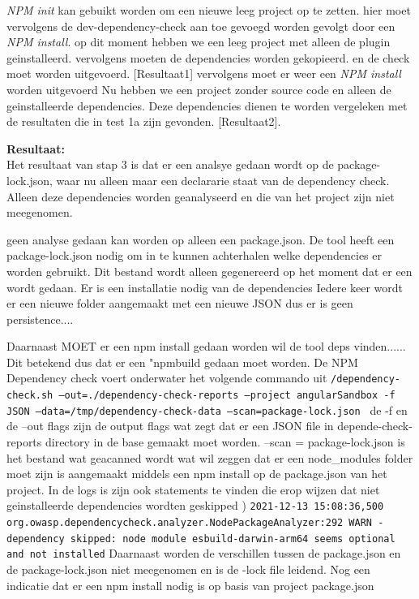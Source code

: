 \textit{NPM init} kan gebuikt worden om een nieuwe leeg project op te zetten. hier moet vervolgens de dev-dependency-check aan toe gevoegd worden gevolgt door een \textit{NPM install}. op dit moment hebben we een leeg project met alleen de plugin geinstalleerd. vervolgens moeten de dependencies worden gekopieerd. en de check moet worden uitgevoerd. [Resultaat1] vervolgens moet er weer een \textit{NPM install} worden uitgevoerd Nu hebben we een project zonder source code en alleen de geinstalleerde dependencies. Deze dependencies dienen te worden vergeleken met de resultaten die in test 1a zijn gevonden. [Resultaat2].

\textbf{Resultaat:}\\
Het resultaat van stap 3 is dat er een analsye gedaan wordt op de package-lock.json, waar nu alleen maar een declararie staat van de dependency check. Alleen deze dependencies worden geanalyseerd en die van het project zijn niet meegenomen.


geen analyse gedaan kan worden op alleen een package.json. De tool heeft een package-lock.json nodig om in te kunnen achterhalen welke dependencies er worden gebruikt. Dit bestand wordt alleen gegenereerd op het moment dat er een  wordt gedaan.
Er is een installatie nodig van de dependencies
Iedere keer wordt er een nieuwe folder aangemaakt met een nieuwe JSON dus er is geen persistence....

Daarnaast MOET er een npm install gedaan worden wil de tool deps vinden...... Dit betekend dus dat er een "npmbuild gedaan moet worden.
De NPM Dependency check voert onderwater het volgende commando uit \texttt{/dependency-check.sh --out=./dependency-check-reports --project angularSandbox -f JSON --data=/tmp/dependency-check-data --scan=package-lock.json
} de -f en de --out flags zijn de output flags wat zegt dat er een JSON file in depende-check-reports directory in de base gemaakt moet worden. --scan = package-lock.json is het bestand wat geacanned wordt wat wil zeggen dat er een node_modules folder moet zijn is aangemaakt middels een npm install op de package.json van het project. In de logs is zijn ook statements te vinden die erop wijzen dat niet geinstalleerde dependencies wordten geskipped ) \texttt{2021-12-13 15:08:36,500 org.owasp.dependencycheck.analyzer.NodePackageAnalyzer:292
WARN  - dependency skipped: node module esbuild-darwin-arm64 seems optional and not installed} Daarnaast worden de verschillen tussen de package.json en de package-lock.json niet meegenomen en is de -lock file leidend. Nog een indicatie dat er een npm install nodig is op basis van project package.json


